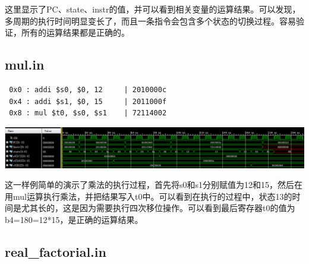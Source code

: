 \documentclass[12pt]{article} %
\begin{document}
\begin{sloppypar}
这里显示了PC、state、instr的值，并可以看到相关变量的运算结果。可以发现，多周期的执行时间明显变长了，而且一条指令会包含多个状态的切换过程。容易验证，所有的运算结果都是正确的。

\subsection{mul.in}

\begin{lstlisting}
 0x0 : addi $s0, $0, 12     | 2010000c
 0x4 : addi $s1, $0, 15     | 2011000f
 0x8 : mul $t0, $s0, $s1    | 72114002
\end{lstlisting}
\noindent
\includegraphics[width =\linewidth]{figure/mul.png}

这一样例简单的演示了乘法的执行过程，首先将s0和s1分别赋值为12和15，然后在用mul运算执行乘法，并把结果写入t0中。可以看到在执行的过程中，状态13的时间是尤其长的，这是因为需要执行四次移位操作。可以看到最后寄存器t0的值为b4=180=12*15，是正确的运算结果。

\subsection{real\_factorial.in}


\end{sloppypar}
\end{document}

